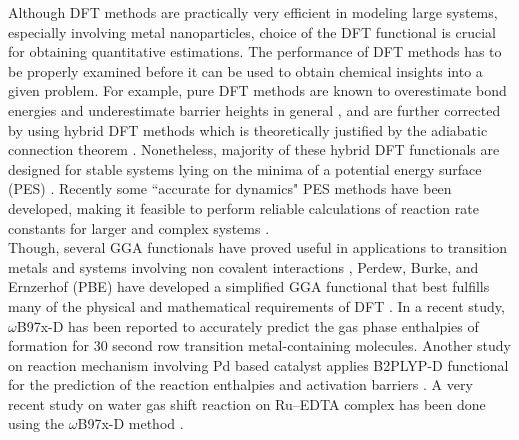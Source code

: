 Although DFT methods are practically very efficient in modeling large systems, especially involving metal nanoparticles, choice of the DFT functional is crucial for obtaining quantitative estimations. The performance of DFT methods has to be properly examined before it can be used to obtain chemical insights into a given problem. For example, pure DFT methods are known to overestimate bond energies and underestimate barrier heights in general \cite{zhao2005}, and are further corrected by using hybrid DFT methods which is theoretically justified by the adiabatic connection theorem \cite{becke1993,kohn1996}. Nonetheless, majority of these hybrid DFT functionals are designed for stable systems lying on the minima of a potential energy surface (PES) \cite{Pu2005}. Recently some ``accurate for dynamics" PES methods have been developed, making it feasible to perform reliable calculations of reaction rate constants for larger and complex systems \cite{lynch2000,lynch2003,zhao2004jpca}. \\ 
Though, several GGA functionals have proved useful in applications to transition metals and systems involving non covalent interactions \cite{goerigk2010efficient,goerigk2011thorough}, Perdew, Burke, and Ernzerhof (PBE) have developed a simplified GGA functional that best fulfills many of the physical and mathematical requirements of DFT \cite{perdew1996}. In a recent study, $\omega$B97x-D has been reported to accurately predict the  gas phase enthalpies of formation for 30 second row transition metal-containing molecules.\cite{laury2013} Another study on reaction mechanism involving Pd based catalyst applies B2PLYP-D functional for the prediction of the reaction enthalpies and activation barriers \cite{theil2014}. A very recent study on water gas shift reaction on Ru--EDTA complex has been done using the $\omega$B97x-D method \cite{chen2015}. \\
